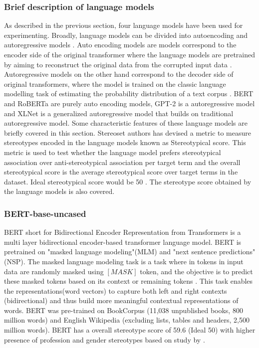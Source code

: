 \subsubsection{Brief description of language models}
As described in the previous section, four language models have been used for experimenting. Broadly, language models can be divided into autoencoding and autoregressive models \cite{yang2019xlnet}. Auto encoding models are models correspond to the encoder side of the original transformer \cite{vaswani2017attention} where the language models are pretrained by aiming to reconstruct the original data from the corrupted input data \cite{yang2019xlnet}. Autoregressive models on the other hand correspond to the decoder side of original transformers, where the model is trained on the classic language modelling task of estimating the probability distribution of a text corpus \cite{yang2019xlnet}. BERT and RoBERTa are purely auto encoding models, GPT-2 is a autoregressive model and XLNet is a generalized autoregressive model that builds on traditional autoregressive model. Some characteristic features of these language models are briefly covered in this section. Stereoset authors has devised a metric to measure stereotypes encoded in the language models known as  Stereotypical score. This metric is used to test whether the language model prefers stereotypical association over anti-stereotypical association per target term \cite{nadeem2020stereoset} and the overall stereotypical score is the average stereotypical score over target terms in the dataset. Ideal stereotypical score would be 50 \cite{nadeem2020stereoset}. The stereotype score obtained by the language models is also covered.   

\subsubsection{BERT-base-uncased}

BERT short for Bidirectional Encoder Representation from Transformers is a multi layer bidirectional encoder-based transformer language model\cite{devlin2018bert}. BERT is pretrained  on "masked language modeling"(MLM) and "next sentence predictions"(NSP). The masked language modeling task is a task where in tokens in input data are randomly masked using $[MASK]$ token, and the objective is to predict these masked tokens based on its context or remaining tokens \cite{devlin2018bert}. This task enables the representations(word vectors) to capture both left and right contexts (bidirectional) and thus build more meaningful contextual representations of words. BERT was pre-trained on BookCorpus (11,038 unpublished books, 800 million words) and English Wikipedia (excluding lists, tables and headers, 2,500 million words). BERT has a overall stereotype score of 59.6 (Ideal 50) with higher presence of profession and gender stereotypes based on study by \cite{nadeem2020stereoset}. 

